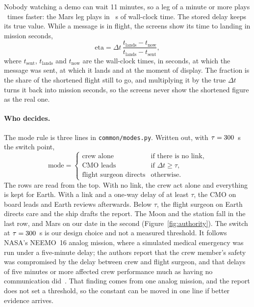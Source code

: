 Nobody watching a demo can wait 11 minutes, so a leg of a minute or more plays \numSpeedup~times faster: the Mars leg plays in \numMarsPlaysAsS~s of wall-clock time. The stored delay keeps its true value. While a message is in flight, the screens show its time to landing in mission seconds,
\begin{equation}\label{eq:eta}
  \text{eta} = \Delta t \,\frac{t_\text{lands} - t_\text{now}}{t_\text{lands} - t_\text{sent}},
\end{equation}
where $t_\text{sent}$, $t_\text{lands}$ and $t_\text{now}$ are the wall-clock times, in seconds, at which the message was sent, at which it lands and at the moment of display. The fraction is the share of the shortened flight still to go, and multiplying it by the true $\Delta t$ turns it back into mission seconds, so the screens never show the shortened figure as the real one.

\paragraph{Who decides.}
The mode rule is three lines in \texttt{common/modes.py}. Written out, with $\tau = 300$~s the switch point,
\begin{equation}\label{eq:mode}
  \text{mode} = \begin{cases}
    \text{crew alone} & \text{if there is no link,} \\
    \text{CMO leads} & \text{if } \Delta t \ge \tau, \\
    \text{flight surgeon directs} & \text{otherwise.}
  \end{cases}
\end{equation}
The rows are read from the top. With no link, the crew act alone and everything is kept for Earth. With a link and a one-way delay of at least $\tau$, the CMO on board leads and Earth reviews afterwards. Below $\tau$, the flight surgeon on Earth directs care and the ship drafts the report. The Moon and the station fall in the last row, and Mars on our date in the second (Figure~\ref{fig:authority}). The switch at $\tau = 300$~s is our design choice and not a measured threshold. It follows NASA's NEEMO~16 analog mission, where a simulated medical emergency was run under a five-minute delay; the authors report that the crew member's safety was compromised by the delay between crew and flight surgeon, and that delays of five minutes or more affected crew performance much as having no communication did~\cite{rader2013delay}. That finding comes from one analog mission, and the report does not set a threshold, so the constant can be moved in one line if better evidence arrives.

